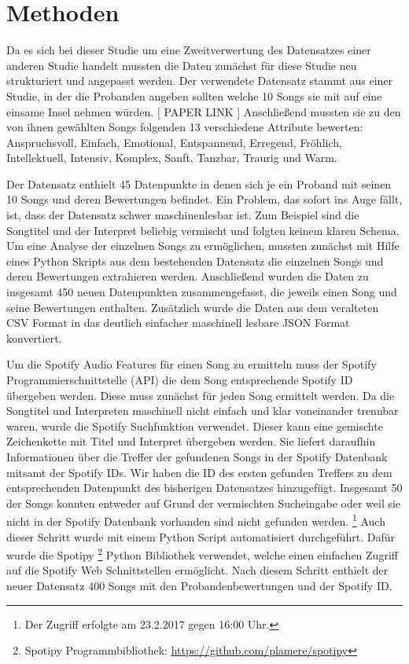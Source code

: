 \section*{Methoden}
\label{sec:Methoden}

Da es sich bei dieser Studie um eine Zweitverwertung des Datensatzes einer anderen Studie handelt mussten die Daten zunächst für diese Studie neu strukturiert und angepasst werden.
Der verwendete Datensatz stammt aus einer Studie, in der die Probanden angeben sollten welche 10 Songs sie mit auf eine einsame Insel nehmen würden. [ PAPER LINK ]
Anschließend mussten sie zu den von ihnen gewählten Songs folgenden 13 verschiedene Attribute bewerten: Anspruchsvoll, Einfach, Emotional, Entspannend, Erregend, Fröhlich, Intellektuell, Intensiv, Komplex, Sanft, Tanzbar, Traurig und Warm.

Der Datensatz enthielt 45 Datenpunkte in denen sich je ein Proband mit seinen 10 Songs und deren Bewertungen befindet.
Ein Problem, das sofort ins Auge fällt, ist, dass der Datensatz schwer maschinenlesbar ist. 
Zum Beispiel sind die Songtitel und der Interpret beliebig vermischt und folgten keinem klaren Schema.
Um eine Analyse der einzelnen Songs zu ermöglichen, mussten zunächst mit Hilfe eines Python Skripts aus dem bestehenden Datensatz die einzelnen Songs und deren Bewertungen extrahieren werden.
Anschließend wurden die Daten zu insgesamt 450 neuen Datenpunkten zusammengefasst, die jeweils einen Song und seine Bewertungen enthalten.
Zusätzlich wurde die Daten aus dem veralteten CSV Format in das deutlich einfacher maschinell lesbare JSON Format konvertiert.

Um die Spotify Audio Features für einen Song zu ermitteln muss der Spotify Programmierschnittstelle (API) die dem Song entsprechende Spotify ID übergeben werden.
Diese muss zunächst für jeden Song ermittelt werden.
Da die Songtitel und Interpreten maschinell nicht einfach und klar voneinander trennbar waren, wurde die Spotify Suchfunktion verwendet.
Dieser kann eine gemischte Zeichenkette mit Titel und Interpret übergeben werden.
Sie liefert daraufhin Informationen über die Treffer der gefundenen Songs in der Spotify Datenbank mitsamt der Spotify IDs.
Wir haben die ID des ersten gefunden Treffers zu dem entsprechenden Datenpunkt des bisherigen Datensatzes hinzugefügt.
Insgesamt 50 der Songs konnten entweder auf Grund der vermischten Sucheingabe oder weil sie nicht in der Spotify Datenbank vorhanden sind nicht gefunden werden.
\footnote{Der Zugriff erfolgte am 23.2.2017 gegen 16:00 Uhr.}
Auch dieser Schritt wurde mit einem Python Script automatisiert durchgeführt.
Dafür wurde die Spotipy \footnote{Spotipy Programmbibliothek: \url{https://github.com/plamere/spotipy}} Python Bibliothek verwendet, welche einen einfachen Zugriff auf die Spotify Web Schnittstellen ermöglicht.
Nach diesem Schritt enthielt der neuer Datensatz 400 Songs mit den Probandenbewertungen und der Spotify ID.

